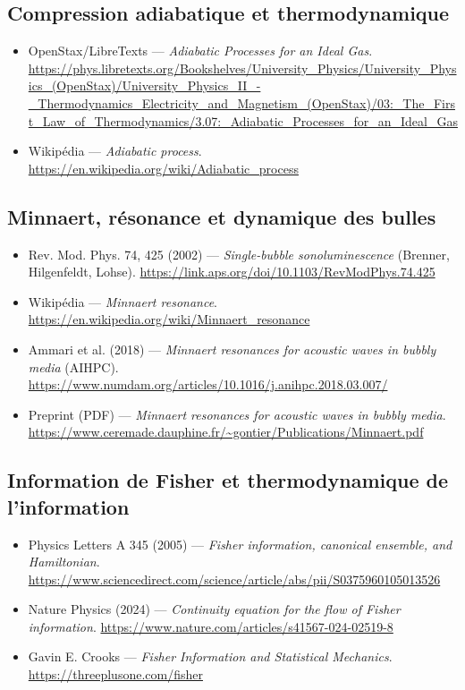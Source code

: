 \documentclass[a4paper,12pt]{article}
\begin{document}
\subsection*{Compression adiabatique et thermodynamique}
\begin{itemize}
\item OpenStax/LibreTexts — \textit{Adiabatic Processes for an Ideal Gas}. \url{https://phys.libretexts.org/Bookshelves/University_Physics/University_Physics_(OpenStax)/University_Physics_II_-_Thermodynamics_Electricity_and_Magnetism_(OpenStax)/03:_The_First_Law_of_Thermodynamics/3.07:_Adiabatic_Processes_for_an_Ideal_Gas}
\item Wikipédia — \textit{Adiabatic process}. \url{https://en.wikipedia.org/wiki/Adiabatic_process}
\end{itemize}

\subsection*{Minnaert, résonance et dynamique des bulles}
\begin{itemize}
\item Rev. Mod. Phys. 74, 425 (2002) — \textit{Single-bubble sonoluminescence} (Brenner, Hilgenfeldt, Lohse). \url{https://link.aps.org/doi/10.1103/RevModPhys.74.425}
\item Wikipédia — \textit{Minnaert resonance}. \url{https://en.wikipedia.org/wiki/Minnaert_resonance}
\item Ammari et al. (2018) — \textit{Minnaert resonances for acoustic waves in bubbly media} (AIHPC). \url{https://www.numdam.org/articles/10.1016/j.anihpc.2018.03.007/}
\item Preprint (PDF) — \textit{Minnaert resonances for acoustic waves in bubbly media}. \url{https://www.ceremade.dauphine.fr/~gontier/Publications/Minnaert.pdf}
\end{itemize}

\subsection*{Information de Fisher et thermodynamique de l’information}
\begin{itemize}
\item Physics Letters A 345 (2005) — \textit{Fisher information, canonical ensemble, and Hamiltonian}. \url{https://www.sciencedirect.com/science/article/abs/pii/S0375960105013526}
\item Nature Physics (2024) — \textit{Continuity equation for the flow of Fisher information}. \url{https://www.nature.com/articles/s41567-024-02519-8}
\item Gavin E. Crooks — \textit{Fisher Information and Statistical Mechanics}. \url{https://threeplusone.com/fisher}
\end{itemize}
\end{document}
